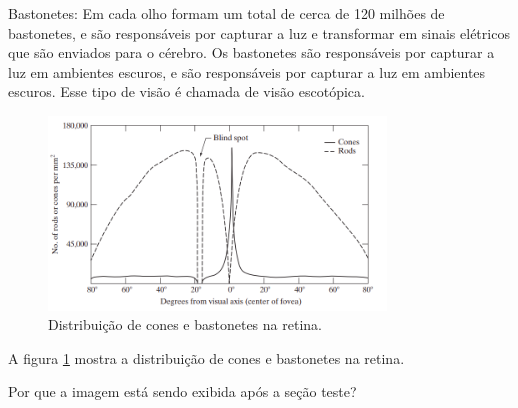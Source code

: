 \documentclass[12pt]{article}
\begin{document}
    Bastonetes: Em cada olho formam um total de cerca de 120 milhões de bastonetes, e são responsáveis
    por capturar a luz e transformar em sinais elétricos que são enviados para o cérebro. Os bastonetes
    são responsáveis por capturar a luz em ambientes escuros, e são responsáveis por capturar a luz em
    ambientes escuros. Esse tipo de visão é chamada de visão escotópica.
\begin{figure}[H]
    \centering
    \includegraphics[width=0.8\textwidth]{images/6.png}
    \caption{Distribuição de cones e bastonetes na retina.}
    \label{fig:exemplo}
\end{figure}

A figura \ref{fig:exemplo} mostra a distribuição de cones e bastonetes na retina.



Por que a imagem está sendo exibida após a seção teste?
\end{document}

